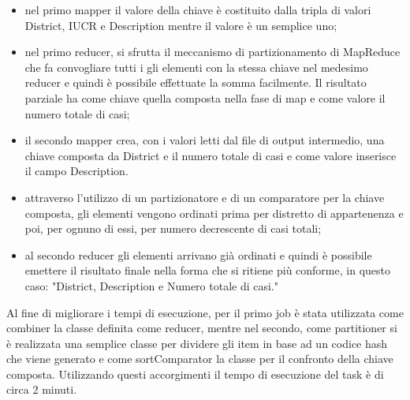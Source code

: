 \documentclass[10pt]{article}
\begin{document}
\begin{itemize}
\item nel primo mapper il valore della chiave è costituito dalla tripla di valori District, IUCR e Description mentre il valore è un semplice uno;
\item nel primo reducer, si sfrutta il meccanismo di partizionamento di MapReduce che fa convogliare tutti i gli elementi con la stessa chiave nel medesimo reducer e quindi è possibile effettuate la somma facilmente. Il risultato parziale ha come chiave quella composta nella fase di map e come valore il numero totale di casi;
\item il secondo mapper crea, con i valori letti dal file di output intermedio, una chiave composta da District e il numero totale di casi e come valore inserisce il campo Description.
\item attraverso l'utilizzo di un partizionatore e di un comparatore per la chiave composta, gli elementi vengono ordinati prima per distretto di appartenenza e poi, per ognuno di essi, per numero decrescente di casi totali;
\item al secondo reducer gli elementi arrivano già ordinati e quindi è possibile emettere il risultato finale nella forma che si ritiene più conforme, in questo caso: "District, Description e Numero totale di casi."
\end{itemize}

Al fine di migliorare i tempi di esecuzione, per il primo job è stata utilizzata come combiner la classe definita come reducer, mentre nel secondo, come partitioner si è realizzata una semplice classe per dividere gli item in base ad un codice hash che viene generato e come sortComparator la classe per il confronto della chiave composta.
Utilizzando questi accorgimenti il tempo di esecuzione del task è di circa 2 minuti.
\end{document}
